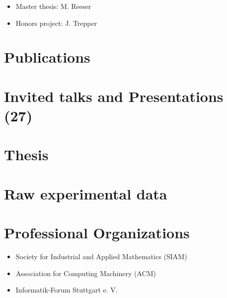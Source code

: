 \documentclass[11pt,a4paper,sans]{moderncv}
\begin{document}
\begin{itemize}[leftmargin=4cm]
\item Master thesis: M. Reeser
\item Honors project: J. Trepper
\end{itemize}

\section{Publications}



 

\section{Invited talks and Presentations (27)}

\section{Thesis}
\section{Raw experimental data}
\section{Professional Organizations}
\cvitem{}{}
\begin{itemize}[leftmargin=4cm]
\item Society for Industrial and Applied Mathematics (SIAM)
\item Association for Computing Machinery (ACM)
\item Informatik-Forum Stuttgart e. V.
\end{itemize}
\end{document}

